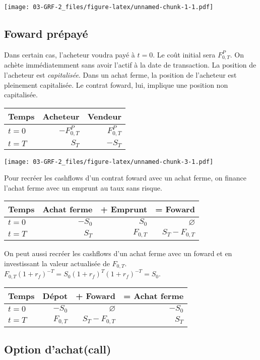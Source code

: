 \documentclass[]{book}
\theoremstyle{definition}
\theoremstyle{definition}
\theoremstyle{definition}
\theoremstyle{remark}
\begin{document}
\texttt{[image: 03-GRF-2\_files/figure-latex/unnamed-chunk-1-1.pdf]}

\subsection{Foward prépayé}\label{foward-prepaye}

Dans certain cas, l'acheteur voudra payé à \(t=0\). Le coût initial sera
\(F_{0,T}^P\). On achète immédiatemment sans avoir l'actif à la date de
transaction. La position de l'acheteur est \emph{capitalisée}. Dans un
achat ferme, la position de l'acheteur est pleinement capitalisée. Le
contrat foward, lui, implique une position non capitalisée.

\begin{tabularx}{0.5\textwidth}{Xrr}
\toprule
Temps & Acheteur & Vendeur \\
\midrule
$t=0$ & $-F_{0,T}^P$ & $F_{0,T}^P$ \\
$t=T$ & $S_T$ & $-S_T$ \\
\bottomrule
\end{tabularx}

\texttt{[image: 03-GRF-2\_files/figure-latex/unnamed-chunk-3-1.pdf]}

Pour recréer les cashflows d'un contrat foward avec un achat ferme, on
finance l'achat ferme avec un emprunt au taux sans risque.

\begin{tabular}{lrrr}
\toprule
Temps & Achat ferme & + Emprunt & = Foward \\
\midrule
$t=0$ & $-S_0$ & $S_0$ & $\varnothing$ \\
$t=T$ & $S_T$ & $F_{0,T}$ & $S_T - F_{0,T}$ \\
\bottomrule
\end{tabular}

On peut aussi recréer les cashflows d'un achat ferme avec un foward et
en investissant la valeur actualisée de \(F_{0,T}\).\\
\(F_{0,T}(1+r_f)^{-T}=S_0(1+r_f)^{T}(1+r_f)^{-T}=S_0\).

\begin{tabular}{lrrr}
\toprule
Temps & Dépot & + Foward & = Achat ferme \\
\midrule
$t=0$ & $-S_0$ & $\varnothing$ & $-S_0$ \\
$t=T$ & $F_{0,T}$ & $S_T - F_{0,T}$ & $S_T$ \\
\bottomrule
\end{tabular}

\subsection{Option d'achat(call)}\label{option-dachatcall}
\end{document}
